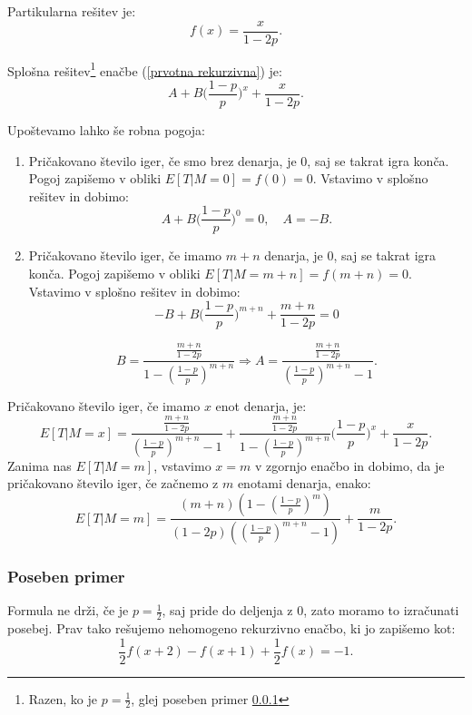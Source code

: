 \documentclass[12pt, a4paper]{article}
\begin{document}
Partikularna rešitev je: $$f(x)=\frac{x}{1-2p}.$$

Splošna rešitev\footnote{Razen, ko je $p=\frac{1}{2}$, glej poseben primer \ref{Poseben primer za 1/2} } enačbe (\ref{prvotna rekurzivna}) je: $$A + B\bigg( \frac{1-p}{p} \bigg )^x+\frac{x}{1-2p}.$$

Upoštevamo lahko še robna pogoja:
\begin{enumerate}
\item Pričakovano število iger, če smo brez denarja, je 0, saj se takrat igra konča. Pogoj zapišemo v obliki $E[T|M= 0] = f(0) = 0$. Vstavimo v splošno rešitev in dobimo:
$$A + B\bigg( \frac{1-p}{p} \bigg )^0 = 0, \quad A = -B.$$
\item Pričakovano število iger, če imamo $m+n$ denarja, je 0, saj se takrat igra konča. Pogoj zapišemo v obliki $E[T|M= m+n] = f(m+n) = 0$. Vstavimo v splošno rešitev in dobimo:
$$-B + B\bigg( \frac{1-p}{p} \bigg )^{m+n}+\frac{m+n}{1-2p}=0$$

$$B = \frac{\frac{m+n}{1-2p}}{1- \left(\frac{1-p}{p}\right)^{m+n}} \Rightarrow A = \frac{\frac{m+n}{1-2p}}{\left(\frac{1-p}{p}\right)^{m+n}-1}.$$
\end{enumerate}

Pričakovano število iger, če imamo $x$ enot denarja, je: $$E[ T | M = x]= \frac{\frac{m+n}{1-2p}}{\left(\frac{1-p}{p}\right)^{m+n}-1} + \frac{\frac{m+n}{1-2p}}{1- \left(\frac{1-p}{p}\right)^{m+n}}\bigg( \frac{1-p}{p} \bigg )^x+\frac{x}{1-2p}.$$
 Zanima nas $E[T|M=m]$, vstavimo $x=m$ v zgornjo enačbo in dobimo, da je pričakovano število iger, če začnemo z $m$ enotami denarja, enako: $$E[T|M=m]=\frac{(m+n) \left(1-\left(\frac{1-p}{p}\right)^m\right)}{(1-2 p)
   \left(\left(\frac{1-p}{p}\right)^{m+n}-1\right)}+\frac{m}{1-2 p}.$$

\subsubsection{Poseben primer}
\label{Poseben primer za 1/2}
Formula ne drži, če je $p = \frac{1}{2}$, saj pride do deljenja z 0, zato moramo to izračunati posebej. Prav tako rešujemo nehomogeno rekurzivno enačbo, ki jo zapišemo kot: 
\begin{equation}
\label{druga rekurzivna}
\frac{1}{2}f(x+2)-f(x+1)+\frac{1}{2}f(x)=-1.
\end{equation}
\end{document}
